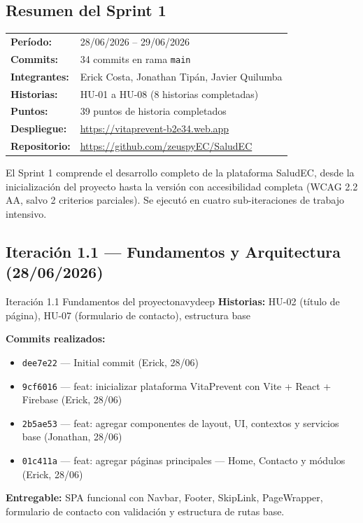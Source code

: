 \documentclass[12pt, a4paper]{article}
\begin{document}
\subsection{Resumen del Sprint 1}

\begin{metabox}
\begin{tabular}{@{}ll@{}}
\textbf{Período:}        & 28/06/2026 -- 29/06/2026 \\
\textbf{Commits:}        & 34 commits en rama \texttt{main} \\
\textbf{Integrantes:}    & Erick Costa, Jonathan Tipán, Javier Quilumba \\
\textbf{Historias:}      & HU-01 a HU-08 (8 historias completadas) \\
\textbf{Puntos:}         & 39 puntos de historia completados \\
\textbf{Despliegue:}     & \url{https://vitaprevent-b2e34.web.app} \\
\textbf{Repositorio:}    & \url{https://github.com/zeuspyEC/SaludEC} \\
\end{tabular}
\end{metabox}

El Sprint 1 comprende el desarrollo completo de la plataforma SaludEC, desde la inicialización del proyecto hasta la versión con accesibilidad completa (WCAG 2.2 AA, salvo 2 criterios parciales). Se ejecutó en cuatro sub-iteraciones de trabajo intensivo.

\subsection{Iteración 1.1 --- Fundamentos y Arquitectura (28/06/2026)}

\begin{iterbox}{Iteración 1.1 \quad Fundamentos del proyecto}{navydeep}
\textbf{Historias:} HU-02 (título de página), HU-07 (formulario de contacto), estructura base

\textbf{Commits realizados:}
\begin{itemize}
  \item \texttt{dee7e22} --- Initial commit (Erick, 28/06)
  \item \texttt{9cf6016} --- feat: inicializar plataforma VitaPrevent con Vite + React + Firebase (Erick, 28/06)
  \item \texttt{2b5ae53} --- feat: agregar componentes de layout, UI, contextos y servicios base (Jonathan, 28/06)
  \item \texttt{01c411a} --- feat: agregar páginas principales --- Home, Contacto y módulos (Erick, 28/06)
\end{itemize}

\textbf{Entregable:} SPA funcional con Navbar, Footer, SkipLink, PageWrapper, formulario de contacto con validación y estructura de rutas base.
\end{iterbox}
\end{document}
